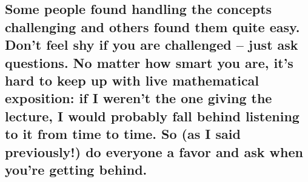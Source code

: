 \documentclass[11pt]{article}
\begin{document}
\begin{itemize}
  \subsection{Some people found handling the concepts challenging and
  others found them quite easy. Don't feel shy if you are challenged --
  just ask questions. No matter how smart you are, it's hard to keep up
  with live mathematical exposition: if I weren't the one giving the
  lecture, I would probably fall behind listening to it from time to
  time. So (as I said previously!) do everyone a favor and ask when
  you're getting
  behind.}\label{some-people-found-handling-the-concepts-challenging-and-others-found-them-quite-easy.-dont-feel-shy-if-you-are-challenged-just-ask-questions.-no-matter-how-smart-you-are-its-hard-to-keep-up-with-live-mathematical-exposition-if-i-werent-the-one-giving-the-lecture-i-would-probably-fall-behind-listening-to-it-from-time-to-time.-so-as-i-said-previously-do-everyone-a-favor-and-ask-when-youre-getting-behind.}
\end{itemize}
\end{document}
